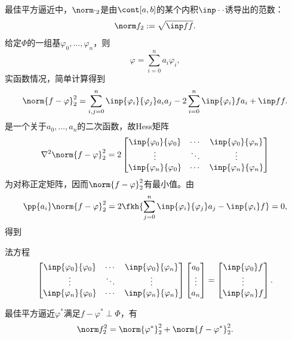 最佳平方逼近中，$\norm\cdot_2$是由$\cont[a,b]$的某个内积$\inp\cdot\cdot$诱导出的范数：
\[
    \norm f_2:=\sqrt{\inp ff}.
\]
给定$\Phi$的一组基$\varphi_0,\ldots,\varphi_n$，则
\[
    \varphi=\sum_{i=0}^na_i\varphi_i,
\]
实函数情况，简单计算得到
\[
    \norm{f-\varphi}_2^2=\sum_{i,j=0}^n\inp{\varphi_i}{\varphi_j}a_ia_j-2\sum_{i=0}^n\inp{\varphi_i}fa_i+\inp ff.
\]
是一个关于$a_0,\ldots,a_n$的二次函数，故Hess矩阵
\begin{equation}
    \nabla^2\norm{f-\varphi}_2^2=2\begin{bmatrix}
        \inp{\varphi_0}{\varphi_0}&\cdots&\inp{\varphi_0}{\varphi_n}\\
        \vdots&\ddots&\vdots\\
        \inp{\varphi_n}{\varphi_0}&\cdots&\inp{\varphi_n}{\varphi_n}
    \end{bmatrix}
\end{equation}
为对称正定矩阵，因而$\norm{f-\varphi}_2^2$有最小值。由
\begin{equation*}
    \pp{a_i}\norm{f-\varphi}_2^2=2\fkh{\sum_{j=0}^n\inp{\varphi_i}{\varphi_j}a_j-\inp{\varphi_i}f}=0,
\end{equation*}
得到
\begin{theorem}
    {法方程}{}
    \begin{equation}
        \begin{bmatrix}
            \inp{\varphi_0}{\varphi_0}&\cdots&\inp{\varphi_0}{\varphi_n}\\
            \vdots&\ddots&\vdots\\
            \inp{\varphi_n}{\varphi_0}&\cdots&\inp{\varphi_n}{\varphi_n}
        \end{bmatrix}\begin{bmatrix}
            a_0\\\vdots\\a_n
        \end{bmatrix}=\begin{bmatrix}
            \inp{\varphi_0}f\\\vdots\\\inp{\varphi_n}f
        \end{bmatrix}.
    \end{equation}
\end{theorem}

\begin{remark}
    最佳平方逼近$\varphi^*$满足$f-\varphi^*\perp\Phi$，有
    \begin{equation}
        \norm f_2^2=\norm{\varphi^*}_2^2+\norm{f-\varphi^*}_2^2.
    \end{equation}
\end{remark}

